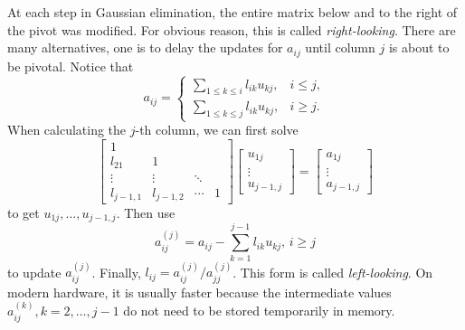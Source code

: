 \begin{exm}
    \label{exm::leftlooking}
    At each step in Gaussian elimination, the entire matrix 
    below and to the right of the pivot was modified. For 
    obvious reason, this is called \textit{right-looking}. 
    There are many alternatives, one is to delay the updates 
    for $a_{ij}$ until column $j$ is about to be pivotal. Notice 
    that 
    $$
        a_{ij}=\left\{
            \begin{array}{lr}
                \sum_{1\leq k\leq i}l_{ik}u_{kj},&i\leq j,\\
                \sum_{1\leq k\leq j}l_{ik}u_{kj},&i\geq j.
            \end{array}
        \right.
    $$  
    When calculating the $j$-th column, we can first solve
    $$
        \begin{bmatrix}
            1\\
            l_{21}&1\\
            \vdots&\vdots&\ddots\\
            l_{j-1,1}&l_{j-1,2}&\cdots&1
        \end{bmatrix}
        \begin{bmatrix}
            u_{1j}\\\vdots\\u_{j-1,j}
        \end{bmatrix}=
        \begin{bmatrix}
            a_{1j}\\\vdots\\a_{j-1,j}
        \end{bmatrix}
    $$ 
    to get $u_{1j},\ldots,u_{j-1,j}$. Then use
    $$
        a_{ij}^{(j)} = a_{ij}-\sum_{k=1}^{j-1}l_{ik}u_{kj},\,i\geq j
    $$ 
    to update $a_{ij}^{(j)}$. Finally, $l_{ij}=a_{ij}^{(j)}/
    a_{jj}^{(j)}$. This form is called 
    \textit{left-looking}. On modern hardware, it is usually 
    faster because the intermediate values $a_{ij}^{(k)}, 
    k=2,\ldots,j-1$ do not need to be stored temporarily in memory.


\end{exm}
